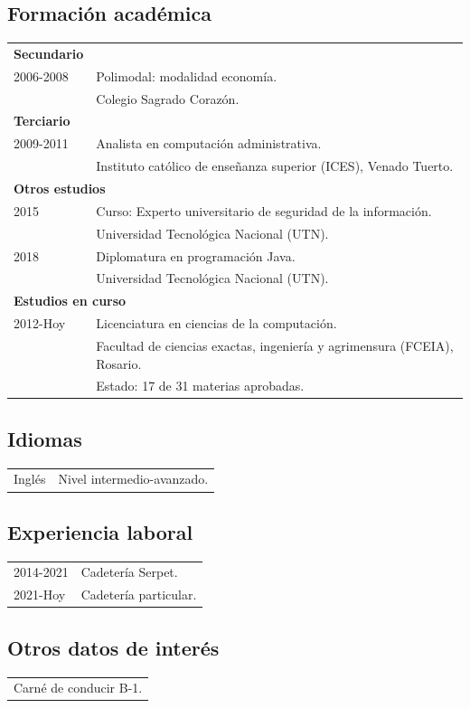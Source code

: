 \documentclass[12pt]{article}
\begin{document}
\subsection*{Formación académica}
\begin{tabular}{l l}
  \multicolumn{1}{l}{\textbf{Secundario}}\\
  2006-2008&Polimodal: modalidad economía.\\
           &\small{Colegio Sagrado Corazón.}\\
  \multicolumn{2}{l}{\textbf{Terciario}}\\
  2009-2011&Analista en computación administrativa.\\
           &\small{Instituto católico de enseñanza superior (ICES), Venado Tuerto.}\\
  \multicolumn{2}{l}{\textbf{Otros estudios}}\\
  2015&Curso: Experto universitario de seguridad de la información.\\
           &\small{Universidad Tecnológica Nacional (UTN).}\\
  2018&Diplomatura en programación Java.\\
           &\small{Universidad Tecnológica Nacional (UTN).}\\
  \multicolumn{2}{l}{\textbf{Estudios en curso}}\\
  2012-Hoy&Licenciatura en ciencias de la computación.\\
           &\small{Facultad de ciencias exactas, ingeniería y agrimensura (FCEIA), Rosario.}\\
           &\small{Estado: 17 de 31 materias aprobadas.}\\
\end{tabular}
\subsection*{Idiomas}
\begin{tabular}{l l}
  Inglés&Nivel intermedio-avanzado.\\
\end{tabular}
\subsection*{Experiencia laboral}
\begin{tabular}{l l}
  2014-2021&Cadetería Serpet.\\
  2021-Hoy&Cadetería particular.
\end{tabular}
\subsection*{Otros datos de interés}
\begin{tabular}{l}
  Carné de conducir B-1.\\
\end{tabular}
\end{document}
